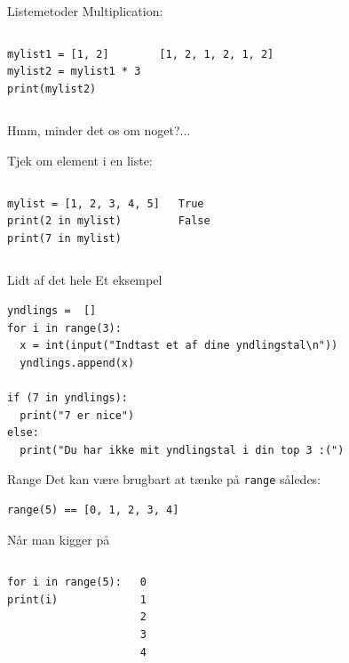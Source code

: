 \begin{frame}[fragile]{Listemetoder}
	Multiplication:
	\begin{columns}
		\begin{lstlisting}[style=python]
mylist1 = [1, 2]
mylist2 = mylist1 * 3
print(mylist2)
		\end{lstlisting}
		\begin{lstlisting}[style=python]
[1, 2, 1, 2, 1, 2]
		\end{lstlisting}
	\end{columns}
\pause
Hmm, minder det os om noget?...

	\pause
	Tjek om element i en liste:
	\begin{columns}
		\column{0.4\textwidth}
		\begin{lstlisting}[style=python]
mylist = [1, 2, 3, 4, 5]
print(2 in mylist)
print(7 in mylist)
		\end{lstlisting}
		\column{0.4\textwidth}
		\begin{lstlisting}[style=python]
True
False
		\end{lstlisting}
	\end{columns}
\end{frame}

\begin{frame}[fragile]{Lidt af det hele}
Et eksempel
	\begin{lstlisting}[style=python]
yndlings =  []
for i in range(3):
  x = int(input("Indtast et af dine yndlingstal\n"))
  yndlings.append(x)

if (7 in yndlings):
  print("7 er nice")
else:
  print("Du har ikke mit yndlingstal i din top 3 :(")
	\end{lstlisting}
\end{frame}


\begin{frame}[fragile]{Range}
Det kan være brugbart at tænke på \texttt{range} således:


\begin{lstlisting}[style=python]
range(5) == [0, 1, 2, 3, 4]
\end{lstlisting}

\pause
Når man kigger på 

\begin{columns}
	\begin{lstlisting}[style=python]
for i in range(5):
print(i)
	\end{lstlisting}
	\begin{lstlisting}[style=python]
0
1
2
3
4
	\end{lstlisting}
\end{columns}
\end{frame}


